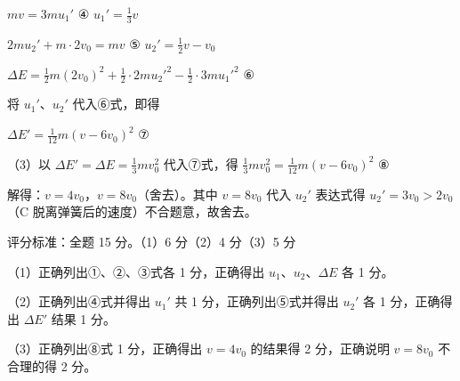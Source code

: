 \documentclass[\gkver]{gaokaozhenti}
\begin{document}
\begin{enumerate}
{$mv = 3mu_{1}'$     ④     $u_{1}' = \frac{1}{3}v$

$2mu_{2}' + m\cdot 2v_{0} = mv$     ⑤     $u_{2}' = \frac{1}{2}v - v_{0}$

$\Delta E = \frac{1}{2}m(2v_{0})^{2} + \frac{1}{2}\cdot 2m u_{2}'^{2} - \frac{1}{2}\cdot 3m u_{1}'^{2}$     ⑥

将 $u_{1}'$、$u_{2}'$ 代入⑥式，即得

$\Delta E' = \frac{1}{12}m(v - 6v_{0})^{2}$     ⑦

（3）以 $\Delta E' = \Delta E = \frac{1}{3}mv_{0}^{2}$ 代入⑦式，得 $\frac{1}{3}mv_{0}^{2} = \frac{1}{12}m(v - 6v_{0})^{2}$     ⑧

解得：$v = 4v_{0}$，$v = 8v_{0}$（舍去）。其中 $v = 8v_{0}$ 代入 $u_{2}'$ 表达式得 $u_{2}' = 3v_{0} > 2v_{0}$（C 脱离弹簧后的速度）不合题意，故舍去。

评分标准：全题 15 分。（1）6 分（2）4 分（3）5 分

（1）正确列出①、②、③式各 1 分，正确得出 $u_{1}$、$u_{2}$、$\Delta E$ 各 1 分。

（2）正确列出④式并得出 $u_{1}'$ 共 1 分，正确列出⑤式并得出 $u_{2}'$ 各 1 分，正确得出 $\Delta E'$ 结果 1 分。

（3）正确列出⑧式 1 分，正确得出 $v = 4v_{0}$ 的结果得 2 分，正确说明 $v = 8v_{0}$ 不合理的得 2 分。
}

\end{enumerate}
\end{document}
